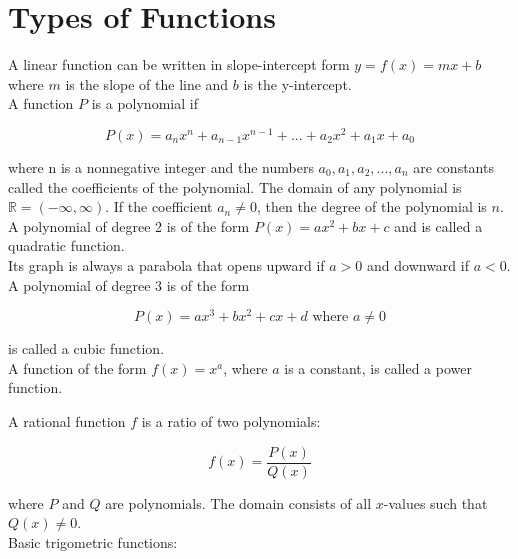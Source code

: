 %
%

\section{Types of Functions}

A linear function can be written in slope-intercept form \(y=f(x)=mx+b\) where \(m\) is the slope of the line and \(b\) is the y-intercept.\\

A function \(P\) is a polynomial if 

$$P(x)=a_nx^n+a_{n-1}x^{n-1}+...+a_2x^2+a_1x+a_0$$

where n is a nonnegative integer and the numbers \(a_0, a_1, a_2,...,a_n\) are constants called the coefficients of the polynomial. The domain of any polynomial is \(\mathbb{R} = (-\infty, \infty)\). If the coefficient \(a_n \neq 0\), then the degree of the polynomial is \(n\).\\

A polynomial of degree 2 is of the form \(P(x)=ax^2+bx+c\) and is called a quadratic function.\\ Its graph is always a parabola that opens upward if \(a > 0\) and downward if \(a < 0\).\\

A polynomial of degree 3 is of the form 

\[ P(x)=ax^3+bx^2+cx+d \text{ where } a \neq 0 \]

is called a cubic function.\\

A function of the form \(f(x) = x^a\), where \(a\) is a constant, is called a power function.

A rational function \(f\) is a ratio of two polynomials:

\[ f(x)=\frac{P(x)}{Q(x)} \]

where \(P\) and \(Q\) are polynomials. The domain consists of all \(x\)-values such that \( Q(x) \neq 0 \).\\

Basic trigometric functions:\\

\begin{center}
\end{center}

